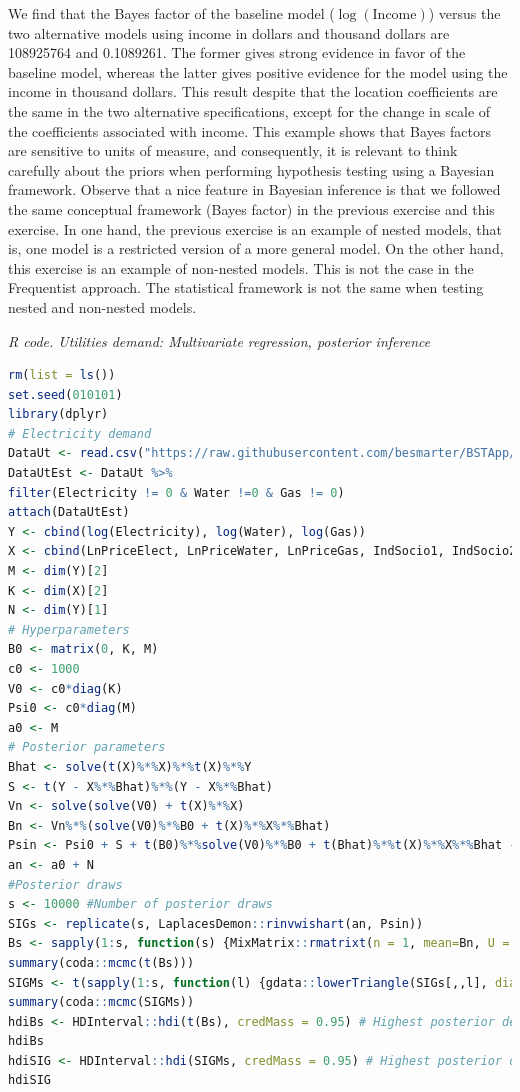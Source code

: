 \begin{enumerate}[leftmargin=*]
We find that the Bayes factor of the baseline model ($\log(\text{Income})$) versus the two alternative models using income in dollars and thousand dollars are 108925764 and 0.1089261. The former gives strong evidence in favor of the baseline model, whereas the latter gives positive evidence for the model using the income in thousand dollars. This result despite that the location coefficients are the same in the two alternative specifications, except for the change in scale of the coefficients associated with income. This example shows that Bayes factors are sensitive to units of measure, and consequently, it is relevant to think carefully about the priors when performing hypothesis testing using a Bayesian framework. Observe that a nice feature in Bayesian inference is that we followed the same conceptual framework (Bayes factor) in the previous exercise and this exercise. In one hand, the previous exercise is an example of nested models, that is, one model is a restricted version of a more general model. On the other hand, this exercise is an example of non-nested models. This is not the case in the Frequentist approach. The statistical framework is not the same when testing nested and non-nested models.

\begin{tcolorbox}[enhanced,width=4.67in,center upper,
	fontupper=\large\bfseries,drop shadow southwest,sharp corners]
	\textit{R code. Utilities demand: Multivariate regression, posterior inference}
	\begin{VF}
		\begin{lstlisting}[language=R]
rm(list = ls())
set.seed(010101)
library(dplyr)
# Electricity demand
DataUt <- read.csv("https://raw.githubusercontent.com/besmarter/BSTApp/refs/heads/master/DataApp/Utilities.csv", sep = ",", header = TRUE, quote = "")
DataUtEst <- DataUt %>%  
filter(Electricity != 0 & Water !=0 & Gas != 0)
attach(DataUtEst)
Y <- cbind(log(Electricity), log(Water), log(Gas))
X <- cbind(LnPriceElect, LnPriceWater, LnPriceGas, IndSocio1, IndSocio2, Altitude, Nrooms, HouseholdMem, Children, Lnincome, 1)
M <- dim(Y)[2]
K <- dim(X)[2]
N <- dim(Y)[1]
# Hyperparameters
B0 <- matrix(0, K, M)
c0 <- 1000
V0 <- c0*diag(K)
Psi0 <- c0*diag(M)
a0 <- M
# Posterior parameters
Bhat <- solve(t(X)%*%X)%*%t(X)%*%Y 
S <- t(Y - X%*%Bhat)%*%(Y - X%*%Bhat)
Vn <- solve(solve(V0) + t(X)%*%X) 
Bn <- Vn%*%(solve(V0)%*%B0 + t(X)%*%X%*%Bhat)
Psin <- Psi0 + S + t(B0)%*%solve(V0)%*%B0 + t(Bhat)%*%t(X)%*%X%*%Bhat - t(Bn)%*%solve(Vn)%*%Bn
an <- a0 + N
#Posterior draws
s <- 10000 #Number of posterior draws
SIGs <- replicate(s, LaplacesDemon::rinvwishart(an, Psin))
Bs <- sapply(1:s, function(s) {MixMatrix::rmatrixt(n = 1, mean=Bn, U = Vn,V = Psin, df = an + 1 - M)})
summary(coda::mcmc(t(Bs)))
SIGMs <- t(sapply(1:s, function(l) {gdata::lowerTriangle(SIGs[,,l], diag=TRUE, byrow=FALSE)}))
summary(coda::mcmc(SIGMs))
hdiBs <- HDInterval::hdi(t(Bs), credMass = 0.95) # Highest posterior density credible interval
hdiBs
hdiSIG <- HDInterval::hdi(SIGMs, credMass = 0.95) # Highest posterior density credible interval
hdiSIG
		\end{lstlisting}
	\end{VF}
\end{tcolorbox} 


\end{enumerate}
